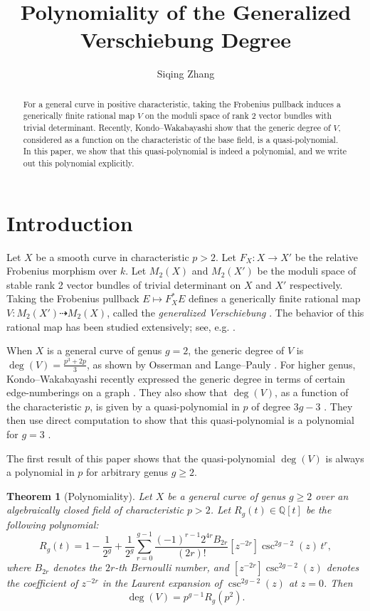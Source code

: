 \documentclass[11pt]{amsart}
\title{Polynomiality of the Generalized Verschiebung Degree}
\author{Siqing Zhang}
\date{}
\newtheorem{theorem}{Theorem}
\begin{document}
\maketitle
\thispagestyle{empty}

\begin{abstract}
For a general curve in positive characteristic, taking the Frobenius pullback induces a generically finite rational map $V$ on the moduli space of rank 2 vector bundles with trivial determinant.
Recently, Kondo--Wakabayashi show that the generic degree of $V$, considered as a function on the characteristic of the base field, is a quasi-polynomial.
In this paper, we show that this quasi-polynomial is indeed a polynomial, and we write out this polynomial explicitly.
\end{abstract}

\section{Introduction}

Let $X$ be a smooth curve in characteristic $p>2$.
Let $F_X: X\to X'$ be the relative Frobenius morphism over $k$.
Let $M_2(X)$ and $M_2(X')$ be the moduli space of stable rank 2 vector bundles of trivial determinant on $X$ and $X'$ respectively.
Taking the Frobenius pullback $E\mapsto F_X^*E$ defines a generically finite rational map $V: M_2(X')\dashrightarrow M_2(X)$, called the \textit{generalized Verschiebung} \cite[Theorem A.6]{Oss1}.
The behavior of this rational map has been studied extensively; see, e.g.
\cite{Gie,LP1,LP2,Oss1,JRXY,LanPa,JoPa,HoWa}.

When $X$ is a general curve of genus $g=2$, the generic degree of $V$ is $\deg(V)=\frac{p^3+2p}{3}$, as shown by Osserman \cite[Theorem 1.3]{Oss1} and Lange--Pauly
\cite[Corollary]{LanPa}.
For higher genus, Kondo--Wakabayashi recently expressed the generic degree in
terms of certain edge-numberings on a graph \cite[Theorem 5.3]{KW}.  
They also show that
$\deg(V)$, as a function of the characteristic $p$, is given by a
quasi-polynomial in $p$ of degree \(3g-3\) \cite[Theorem 5.5]{KW}.
They then use direct computation to show that this quasi-polynomial is a polynomial for $g=3$ \cite[Theorem C]{KW}.

The first result of this paper shows that the quasi-polynomial $\deg(V)$ is always a polynomial in $p$ for arbitrary genus $g\geq 2$.

\begin{theorem}[Polynomiality]\label{thm: polynomiality}
    Let $X$ be a general curve of genus $g\geq 2$ over an algebraically closed field of characteristic $p>2$.
    Let $R_g(t)\in \mathbb{Q}[t]$ be the following polynomial:
    \[R_g(t)=
1-\frac{1}{2^g}+\frac{1}{2^g}
\sum_{r=0}^{g-1}
\frac{(-1)^{r-1} 2^{4r}B_{2r}}{(2r)!}
\left[z^{-2r}\right]
\csc^{2g-2}(z)\,
t^r ,\]
where $B_{2r}$ denotes the $2r$-th Bernoulli number, and $\left[z^{-2r}\right]
\csc^{2g-2}(z)$ denotes the coefficient of $z^{-2r}$ in the Laurent expansion of $\csc^{2g-2}(z)$ at $z=0$.
Then 
\[\deg(V)=p^{g-1} R_g(p^2).\]
\end{theorem}
\end{document}
